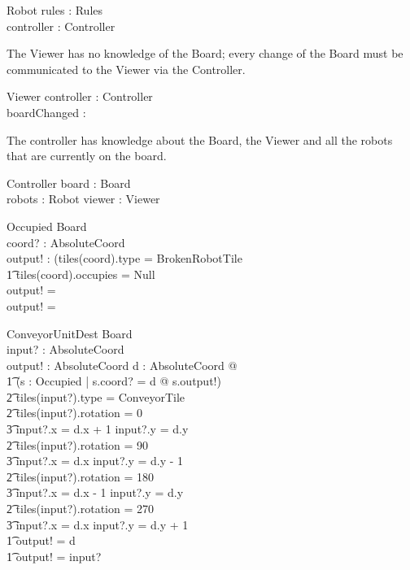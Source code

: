 \documentclass[12pt]{article}
\begin{document}
\begin{schema}{Robot}
rules : Rules \\
controller : Controller
\end{schema}

The Viewer has no knowledge of the Board; every change of the Board must be communicated to the Viewer via the Controller.

\begin{schema}{Viewer}
controller : Controller \\
boardChanged : \bool
\end{schema}

The controller has knowledge about the Board, the Viewer and all the robots that are currently on the board.

\begin{schema}{Controller}
board : Board \\
robots : \power Robot
viewer : Viewer
\end{schema}

\begin{schema}{Occupied}
\Xi Board \\
coord? : AbsoluteCoord \\
output! : \bool
\where
\IF (tiles(coord).type = BrokenRobotTile \; \; \vee \\ \t1
tiles(coord).occupies \not = Null \\
\THEN
output! = \true \\
\ELSE
output! = \false
\end{schema}

\begin{schema}{ConveyorUnitDest}
\Xi Board \\
input? : AbsoluteCoord \\
output! : AbsoluteCoord
\where
\IF \exists d : AbsoluteCoord @ \\ \t1
    (\exists s : Occupied | s.coord? = d @ \neg s.output!) \; \; \wedge \\ \t2
        tiles(input?).type = ConveyorTile \\ \t2
        tiles(input?).rotation = 0 \Rightarrow \\ \t3 input?.x = d.x + 1 \wedge input?.y = d.y \\ \t2
        tiles(input?).rotation = 90 \Rightarrow \\ \t3 input?.x = d.x \wedge input?.y = d.y - 1 \\ \t2
        tiles(input?).rotation = 180 \Rightarrow \\ \t3 input?.x = d.x - 1 \wedge input?.y = d.y \\ \t2
        tiles(input?).rotation = 270 \Rightarrow \\ \t3 input?.x = d.x \wedge input?.y = d.y + 1 \\ \t1
    \THEN output! = d \\ \t1
    \ELSE output! = input?
\end{schema}
\end{document}
